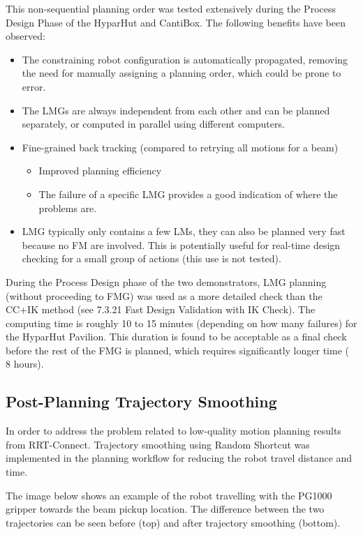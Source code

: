 This non-sequential planning order was tested extensively during the Process Design Phase of the HyparHut and CantiBox. The following benefits have been observed:
\begin{itemize}
    \item The constraining robot configuration is automatically propagated, removing the need for manually assigning a planning order, which could be prone to error.
    \item The LMGs are always independent from each other and can be planned separately, or computed in parallel using different computers.
    \item Fine-grained back tracking (compared to retrying all motions for a beam)
    \begin{itemize}
        \item Improved planning efficiency
        \item The failure of a specific LMG provides a good indication of where the problems are.
    \end{itemize}
    \item LMG typically only contains a few LMs, they can also be planned very fast because no FM are involved. This is potentially useful for real-time design checking for a small group of actions (this use is not tested).
\end{itemize}

During the Process Design phase of the two demonstrators, LMG planning (without proceeding to FMG) was used as a more detailed check than the CC+IK method (see 7.3.21 Fast Design Validation with IK Check). The computing time is roughly 10 to 15 minutes (depending on how many failures) for the HyparHut Pavilion. This duration is found to be acceptable as a final check before the rest of the FMG is planned, which requires significantly longer time (~ 8 hours).

\subsection{Post-Planning Trajectory Smoothing}
\label{subsection:exploration_4_post_planning_trajectory_smoothing}

In order to address the problem related to low-quality motion planning results from RRT-Connect. Trajectory smoothing using Random Shortcut \parencite{zhaoTrajectorySmoothingUsing2015} was implemented in the planning workflow for reducing the robot travel distance and time.

The image below shows an example of the robot travelling with the PG1000 gripper towards the beam pickup location. The difference between the two trajectories can be seen before (top) and after trajectory smoothing (bottom). 

